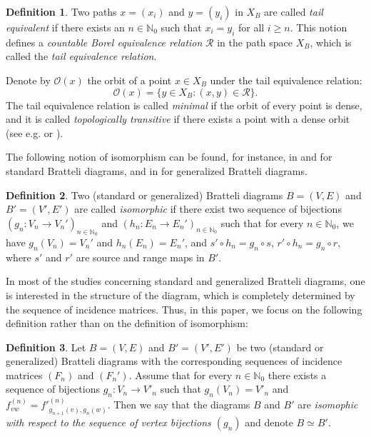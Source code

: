 \documentclass[11pt, twoside]{amsart}
\theoremstyle{definition}
\newtheorem{definition}{Definition}[section]
\theoremstyle{remark}
\theoremstyle{plain}
\newcommand{\tcr}{\textcolor{red}}
\newcommand{\N}{\mathbb N}
\numberwithin{equation}{section}
\begin{document}
\begin{definition}\label{Def:Tail_equiv_relation}
Two paths $x= (x_i)$ and $y=(y_i)$ in $X_B$ are called 
\textit{tail equivalent} if there exists an $n \in \mathbb{N}_0$ 
such that $x_i = y_i$ for all $i \geq n$. This notion defines a \textit{countable Borel equivalence relation} $\mathcal R$ in the path space $X_B$, which is called the \textit{tail equivalence relation}.
\end{definition}

Denote by $\mathcal{O}(x)$ the orbit of a point $x \in X_B$ under the tail equivalence relation:
$$
\mathcal{O}(x) = \{y \in X_B : (x,y) \in \mathcal{R}\}.
$$
The tail equivalence relation is called \textit{minimal} if the orbit of every point is dense, and it is called \textit{topologically transitive} if there exists a point with a dense orbit (see e.g. \cite{KatokHasselblatt1995} or \cite{Bruin2022}). %

The following notion of isomorphism can be found, for instance, in \cite[Section 2]{HermanPutnamSkau1992} and \cite[Subsection 6.3.1]{Durand2010} for standard Bratteli diagrams, and in \cite[Definition 2.8]{BezuglyiJorgensenKarpelSanadhya2025} for generalized Bratteli diagrams.

\begin{definition} \label{def_isom BD}
Two (standard or generalized) Bratteli diagrams $B = (V, E)$ and $B' = 
(V', E')$ 
are called \textit{isomorphic} if there exist two sequence of
bijections $(g_n : V_n \rightarrow V_n')_{n \in \N_0}$ and 
$(h_n : E_n \rightarrow E_n')_{n \in \N_0}$ such that 
for every $n \in \N_0$, we have $g_n(V_n) = V_n'$ and $h_n(E_n) = 
E_n'$, and $s' \circ h_n = g_n \circ s$, $r' \circ h_n = 
g_n \circ r$,  where $s'$ and $r'$ are source and range maps in $B'$.
\end{definition}

In most of the studies concerning standard and generalized Bratteli diagrams, one is interested in the structure of the diagram, which is completely determined by the sequence of incidence matrices. 
Thus, in this paper, we focus on the following definition rather than on the definition of isomorphism:


\begin{definition}
Let $B = (V,E)$ and $B' = (V',E')$ be two (standard or generalized) Bratteli diagrams with the corresponding sequences of incidence matrices $(F_n)$ and $(F_n')$. Assume that for every $n \in \mathbb{N}_0$ there exists a sequence of bijections $g_n \colon V_n \rightarrow V'_n$ such that $g_n(V_n) = V'_n$ and $f^{(n)}_{vw} = {f'}^{(n)}_{g_{n+1}(v),g_{n}(w)}$. Then we say that the diagrams $B$ and $B'$ are \textit{isomophic with respect to the sequence of vertex bijections $(g_n)$} and denote $B \simeq B'$. 
\end{definition}
\end{document}
